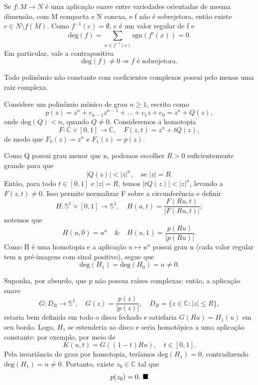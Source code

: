 \documentclass[../differential_topology.tex]{subfiles}
\begin{document}
\begin{tcolorbox}[
		skin=enhanced,
		title=Observação,
		fonttitle=\bfseries,
		colframe=black,
		colbacktitle=cyan!75!white,
		colback=cyan!15,
		colbacklower=black,
		coltitle=black,
		drop fuzzy shadow,
	]
	Se \(f:M\rightarrow N\) é uma aplicação suave entre variedades orientadas de mesma dimensão, com M compacta e N conexa, e f não é sobrejetora, então existe \(c\in N\setminus f(M)\). Como \(f^{-1}(c)=\emptyset\), c é um valor regular de f e
	\[
		\mathrm{deg}(f)=\sum\limits_{x\in f^{-1}(c)}\mathrm{sgn}(f'(x))=0.
	\]
	Em particular, vale a contrapositiva
	\[
		\mathrm{deg}(f)\neq0\Rightarrow f\text{ é sobrejetora}.
	\]
\end{tcolorbox}

\hypertarget{fundamental_theorem_algebra}{\begin{theorem*}
		Todo polinômio não constante com coeficientes complexos possui pelo menos uma raiz complexa.
	\end{theorem*}}
\begin{proof*}
	Considere um polinômio mônico de grau \(n\geq1\), escrito como
	\[
		p(z)=z^{n}+c_{n-1}z^{n-1}+\dotsc+c_1z+c_0=z^{n}+Q(z),
	\]
	onde \(\mathrm{deg}(Q)<n\), quando \(Q\neq0\). Consideremos a homotopia
	\[
		F:\mathbb{C}\times[0,1]\rightarrow\mathbb{C},\quad F(z,t)=z^{n}+tQ(z),
	\]
	de modo que \(F_0(z)=z^{n}\) e \(F_1(z)=p(z)\).

	Como Q possui grau menor que n, podemos escolher \(R>0\) suficientemente grande para que
	\[
		|Q(z)|<|z|^{n},\quad\text{se }|z|=R.
	\]
	Então, para todo \(t\in[0,1]\) e \(|z|=R\), temos \(|tQ(z)|<|z|^{n}\), levando a \(F(z,t)\neq0\). Isso permite normalizar F sobre a circunferência e definir
	\[
		H:\mathbb{S}^{1}\times[0,1]\rightarrow\mathbb{S}^{1},\quad
		H(u,t)=\frac{F(Ru,t)}{|F(Ru,t)|};
	\]
	notemos que
	\[
		H(u,0)=u^{n} \quad\&\quad H(u,1)=\frac{p(Ru)}{|p(Ru)|}.
	\]
	Como H é uma homotopia e a aplicação \(u\mapsto u^{n}\) possui grau n (cada valor regular tem n pré-imagens com sinal positivo), segue que
	\[
		\mathrm{deg}(H_1)=\mathrm{deg}(H_0)=n\neq0.
	\]

	Suponha, por absurdo, que p não possua raízes complexas; então, a aplicação suave
	\[
		G:D_R\rightarrow\mathbb{S}^{1},\quad G(z)=\frac{p(z)}{|p(z)|},\quad
		D_R=\{z\in\mathbb{C}:|z|\leq R\},
	\]
	estaria bem definida em todo o disco fechado e satisfaria \(G(Ru)=H_1(u)\) em seu bordo. Logo, \(H_1\) se estenderia ao disco e seria homotópica a uma aplicação constante: por exemplo, por meio de
	\[
		K(u,t)=G((1-t)Ru),\quad t\in[0,1].
	\]
	Pela invariância do grau por homotopia, teríamos \(\mathrm{deg}(H_1)=0\), contradizendo \(\mathrm{deg}(H_1)=n\neq0\). Portanto, existe \(z_0\in\mathbb{C}\) tal que
	\[
		p(z_0)=0. \text{ $\blacksquare$}
	\]
\end{proof*}
\end{document}
